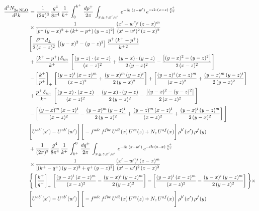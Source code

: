 \documentclass[9pt]{article}
\numberwithin{equation}{section}
\begin{document}
{\begin{align*}
    \frac{d^{3}N_{2a\,\rm NLO}^{\rm}}{d^{3}k}  & =  \frac{1}{(2\pi)^{3}}\, \frac{g^{4}}{8\pi^{4}}\,\frac{1}{k^{+}}\,\int_{0}^{k^{+}}\, \frac{dp^{+}}{2\pi}\,\int_{x,y,z,x',w'}\, e^{-ik\cdot(z-w')}\,e^{-ik\cdot (x-z)\,\frac{p^{+}}{k^{+}}}\notag \\ & \times\frac{1}{\left[p^{+}\,(y-x)^{2}+(k^{+}-p^{+})\,(y-z)^{2}\right]}\, \frac{(x'-w')^{i}\,(z-x)^{m}}{(x'-w')^{2}\,(z-x)^{2}} \notag \\ & \Bigg[\frac{\delta^{im}\,d_{\perp}}{2\,(x-z)^{2}}\,\left[(y-x)^{2}-(y-z)^{2}\right]\,\frac{p^{+}\,(k^{+}-p^{+})}{k^{+\,2}}\notag \\ & +\frac{(k^{+}-p^{+})\,\delta_{im}}{k^{+}}\,\left[\frac{(y-z)\cdot (x-z)}{(x-z)^{2}}+\frac{(y-x)\cdot (y-z)}{2\,(y-x)^{2}}-\frac{\left[(y-x)^{2}-(y-z)^{2}\right]}{2\,(x-z)^{2}}\right]\notag \\ & -\left[\frac{k^{+}}{p^{+}}\right]_{+}\,\left[\frac{(y-z)^{i}\,(x-z)^{m}}{(x-z)^{2}}+\frac{(y-x)^{m}\,(y-z)^{i}}{2\,(y-x)^{2}}\right]+ \left[\frac{(y-z)^{i}\,(x-z)^{m}}{(x-z)^{2}}+\frac{(y-x)^{m}\,(y-z)^{i}}{2\,(y-x)^{2}}\right]\notag \\ & +\frac{p^{+}\,\delta_{im}}{k^{+}}\,\left[\frac{(y-x)\cdot (x-z)}{(x-z)^{2}}-\frac{(y-x)\cdot (y-z)}{2\,(y-z)^{2}}-\frac{\left[(y-x)^{2}-(y-z)^{2}\right]}{2\,(x-z)^{2}}\right]\notag \\ &-\left[\frac{(y-x)^{m}\,(x-z)^{i}}{(x-z)^{2}}-\frac{(y-x)^{m}\,(y-z)^{i}}{2\,(y-z)^{2}}+\frac{(y-z)^{m}\,(x-z)^{i}}{(x-z)^{2}}+\frac{(y-x)^{i}\,(y-z)^{m}}{2\,(y-x)^{2}}\right]\Bigg] \notag \\ & \Bigg[U^{ab'}(x')-U^{ab'}(w')\Bigg]\,\Bigg[-f^{adc}\,f^{fbe}\,U^{db}(x)\,U^{ce}(z)+N_{c}\,U^{af}(x)\Bigg]\,\rho^{b'}(x')\,\rho^{f}(y)\notag \\ & + \frac{1}{(2\pi)^{3}}\,\frac{g^{4}}{8\pi^{4}}\,\frac{1}{k^{+}}\, \int^{0}_{k^{+}}\, \frac{dq^{+}}{2\pi} \,  \int_{x,y,z,x',w'}\,e^{-ik\cdot(x-w')}\,e^{-ik\cdot (z-x)\,\frac{q^{+}}{k^{+}}}\notag \\ & \times\frac{1}{\left[(k^{+}-q^{+})\,(y-x)^{2}+q^{+}\,(y-z)^{2}\right]}\, \frac{(x'-w')^{i}\,(z-x)^{m}}{(x'-w')^{2}\,(z-x)^{2}} \notag \\ &\Bigg\{\left[\frac{k^{+}}{q^{+}}\right]_{+}\,\left[\frac{(y-x)^{i}\,(x-z)^{m}}{(x-z)^{2}}-\frac{(y-x)^{i}\,(y-z)^{m}}{2\,(y-z)^{2}}\right] -\left[\frac{(y-x)^{i}\,(x-z)^{m}}{(x-z)^{2}}-\frac{(y-x)^{i}\,(y-z)^{m}}{2\,(y-z)^{2}}\right]\Bigg\}\times\,\notag \\ & \Bigg[U^{ab'}(x')-U^{ab'}(w')\Bigg]\,\Bigg[-f^{adc}\,f^{fbe}\,U^{db}(x)\,U^{ce}(z)+N_{c}\,U^{af}(x)\Bigg]\,\rho^{b'}(x')\,\rho^{f}(y)

\end{align*}}
\end{document}
